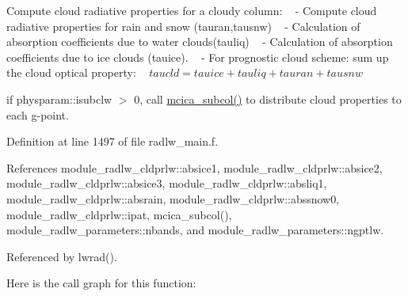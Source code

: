 \begin{DoxyEnumerate}
\item Compute cloud radiative properties for a cloudy column\+: ~\newline
 -\/ Compute cloud radiative properties for rain and snow (tauran,tausnw) ~\newline
 -\/ Calculation of absorption coefficients due to water clouds(tauliq) ~\newline
 -\/ Calculation of absorption coefficients due to ice clouds (tauice). ~\newline
 -\/ For prognostic cloud scheme\+: sum up the cloud optical property\+: ~\newline
 $ taucld=tauice+tauliq+tauran+tausnw $
\item if physparam\+::isubclw $>$ 0, call \hyperlink{group__module__radlw__main_ga9318778651bca6ec1f1776da6c21dfda}{mcica\+\_\+subcol()} to distribute cloud properties to each g-\/point. 
\end{DoxyEnumerate}

Definition at line 1497 of file radlw\+\_\+main.\+f.



References module\+\_\+radlw\+\_\+cldprlw\+::absice1, module\+\_\+radlw\+\_\+cldprlw\+::absice2, module\+\_\+radlw\+\_\+cldprlw\+::absice3, module\+\_\+radlw\+\_\+cldprlw\+::absliq1, module\+\_\+radlw\+\_\+cldprlw\+::absrain, module\+\_\+radlw\+\_\+cldprlw\+::abssnow0, module\+\_\+radlw\+\_\+cldprlw\+::ipat, mcica\+\_\+subcol(), module\+\_\+radlw\+\_\+parameters\+::nbands, and module\+\_\+radlw\+\_\+parameters\+::ngptlw.



Referenced by lwrad().

Here is the call graph for this function\+:
\mbox{\label{group__module__radlw__main_gaf20db29eaadab298ccd8b6bf489a53f4}} 
